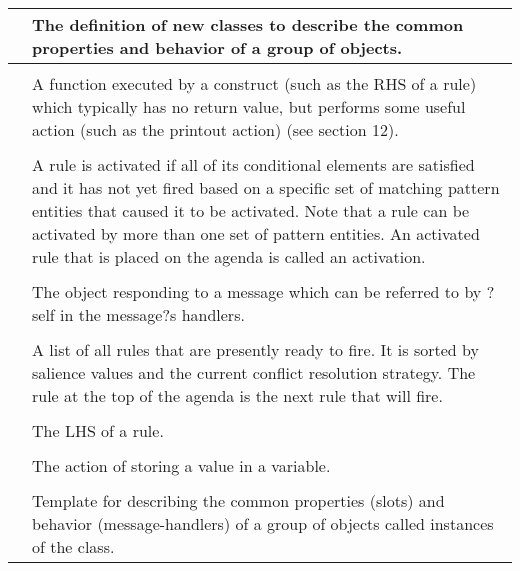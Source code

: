 \documentclass[letterpaper,10pt,english]{sphinxmanual}
\begin{document}
\begin{savenotes}\sphinxattablestart
\centering
\begin{tabulary}{\linewidth}[t]{|T|T|}
\hline

&
The definition of new classes to describe the common properties and behavior of a group of objects.
\\
\hline

&\\
\hline
{}
&
A function executed by a construct (such as the RHS of a rule) which typically has no return value, but performs some useful action (such as the printout action) (see section 12).
\\
\hline

&\\
\hline
{}
&
A rule is activated if all of its conditional elements are satisfied and it has not yet fired based on a specific set of matching pattern entities that caused it to be activated. Note that a rule can be activated by more than one set of pattern entities. An activated rule that is placed on the agenda is called an activation.
\\
\hline

&\\
\hline
{}
&
The object responding to a message which can be referred to by ?self in the message?s handlers.
\\
\hline

&\\
\hline
{}
&
A list of all rules that are presently ready to fire. It is sorted by salience values and the current conflict resolution strategy. The rule at the top of the agenda is the next rule that will fire.
\\
\hline

&\\
\hline
{}
&
The LHS of a rule.
\\
\hline

&\\
\hline
{}
&
The action of storing a value in a variable.
\\
\hline

&\\
\hline
{}
&
Template for describing the common properties (slots) and behavior (message-handlers) of a group of objects called instances of the class.
\\
\hline


\end{tabulary}
\end{savenotes}
\end{document}
